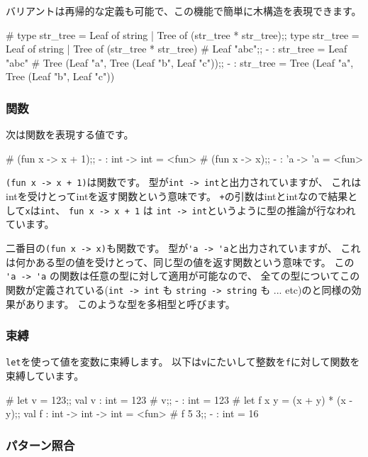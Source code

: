\documentclass[mingoth,a4paper]{jsarticle}
\begin{document}
バリアントは再帰的な定義も可能で、この機能で簡単に木構造を表現できます。

\begin{commandline}
# type str_tree = Leaf of string | Tree of (str_tree * str_tree);;
type str_tree = Leaf of string | Tree of (str_tree * str_tree)
# Leaf "abc";;
- : str_tree = Leaf "abc"
# Tree (Leaf "a", Tree (Leaf "b", Leaf "c"));;
- : str_tree = Tree (Leaf "a", Tree (Leaf "b", Leaf "c"))
\end{commandline}

\subsubsection{関数}

次は関数を表現する値です。

\begin{commandline}
# (fun x -> x + 1);;
- : int -> int = <fun>
# (fun x -> x);;
- : 'a -> 'a = <fun>
\end{commandline}

\verb|(fun x -> x + 1)|は関数です。
型が\verb|int -> int|と出力されていますが、
これはintを受けとってintを返す関数という意味です。
\verb|+|の引数はintとintなので結果として\verb|x|は\verb|int|、
\verb|fun x -> x + 1| は \verb|int -> int|というように型の推論が行なわれています。

二番目の\verb|(fun x -> x)|も関数です。
型が\verb|'a -> 'a|と出力されていますが、
これは何かある型の値を受けとって、同じ型の値を返す関数という意味です。
この \verb|'a -> 'a| の関数は任意の型に対して適用が可能なので、
全ての型についてこの関数が定義されている(\verb|int -> int| も \verb|string -> string| も ... etc)のと同様の効果があります。
このような型を多相型と呼びます。

\subsubsection{束縛}

\verb|let|を使って値を変数に束縛します。
以下は\verb|v|にたいして整数を\verb|f|に対して関数を束縛しています。

\begin{commandline}
# let v = 123;;
val v : int = 123
# v;;
- : int = 123
# let f x y = (x + y) * (x - y);;
val f : int -> int -> int = <fun>
# f 5 3;;
- : int = 16
\end{commandline}

\subsubsection{パターン照合}
\end{document}
